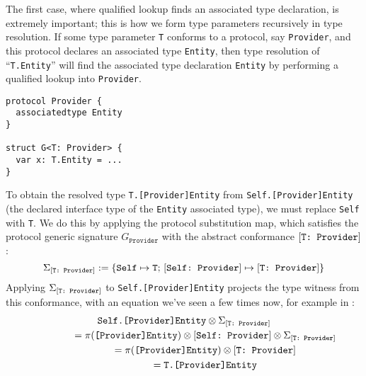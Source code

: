 \documentclass[../generics]{subfiles}
\begin{document}
The first case, where qualified lookup finds an associated type declaration, is extremely important; this is how we form type parameters recursively in type resolution. If some type parameter \texttt{T} conforms to a protocol, say \texttt{Provider}, and this protocol declares an associated type \texttt{Entity}, then type resolution of ``\texttt{T.Entity}'' will find the associated type declaration \texttt{Entity} by performing a qualified lookup into \texttt{Provider}.
\begin{Verbatim}
protocol Provider {
  associatedtype Entity
}

struct G<T: Provider> {
  var x: T.Entity = ...
}
\end{Verbatim}
To obtain the resolved type \texttt{T.[Provider]Entity} from \texttt{Self.[Provider]Entity} (the declared interface type of the \texttt{Entity} associated type), we must replace \texttt{Self} with \texttt{T}. We do this by applying the protocol substitution map, which satisfies the protocol generic signature $G_\texttt{Provider}$ with the abstract conformance $[\texttt{T:~Provider}]$: \[\Sigma_{[\texttt{T:~Provider}]}:=\{\texttt{Self} \mapsto \texttt{T};\,[\texttt{Self:~Provider}] \mapsto [\texttt{T:~Provider}]\}\]
Applying $\Sigma_{[\texttt{T:~Provider}]}$ to \texttt{Self.[Provider]Entity} projects the type witness from this conformance, with an equation we've seen a few times now, for example in :
\begin{gather*}
\texttt{Self.[Provider]Entity}\otimes\Sigma_{[\texttt{T:~Provider}]}\\
\qquad\qquad{}=\pi(\texttt{[Provider]Entity})\otimes[\texttt{Self:~Provider}]\otimes\Sigma_{[\texttt{T:~Provider}]}\\
\qquad\qquad{}=\pi(\texttt{[Provider]Entity})\otimes[\texttt{T:~Provider}]\\
\qquad\qquad{}=\texttt{T.[Provider]Entity}
\end{gather*}
\end{document}
